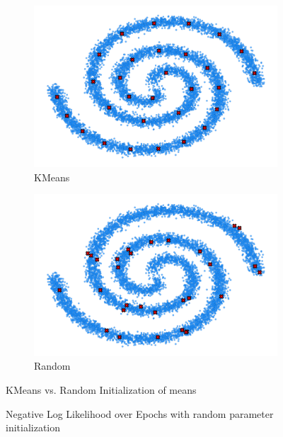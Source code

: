 \begin{figure}[H]
    \centering
    \begin{subfigure}[b]{0.4\textwidth} 
        \centering
        \includegraphics[width=\textwidth]{figures/spirals/30_kmeans_data.png}
        \caption{KMeans}
    \end{subfigure}
    \begin{subfigure}[b]{0.4\textwidth} 
        \centering
        \includegraphics[width=\textwidth]{figures/spirals/30_random1_data.png} 
        \caption{Random}
    \end{subfigure} 
    \caption{KMeans vs. Random Initialization of means}
\end{figure}

\begin{figure}[H]
    \centering
    \caption{Negative Log Likelihood over Epochs with random parameter initialization}
\end{figure}

